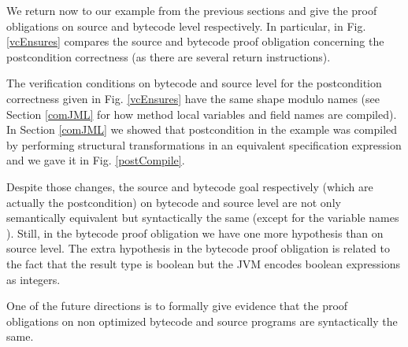  We return now to our example from the previous sections and give the proof obligations on source and bytecode level respectively. 
In particular, in Fig. \ref{vcEnsures} compares the source and bytecode proof obligation concerning the postcondition correctness (as there are several return instructions).

The verification conditions on bytecode and source level for the postcondition  correctness given in Fig. \ref{vcEnsures}
 have the same shape modulo names (see Section \ref{comJML} for how method local variables and field names are compiled). 
 In Section \ref{comJML} we showed that postcondition in the example was compiled by performing structural transformations 
in an equivalent specification expression and we gave it in Fig. \ref{postCompile}. 

Despite those changes, the source and bytecode goal respectively (which are actually the postcondition) on bytecode and source level are not only
semantically equivalent but syntactically the same (except for the variable names ). Still, in the bytecode proof obligation we have one more hypothesis than on source level. The extra hypothesis in the bytecode proof obligation is related to the fact that the result type is boolean but the JVM encodes boolean expressions as integers.


One of the future directions is to formally give evidence that the proof obligations on non optimized bytecode and source programs are syntactically the same. 






